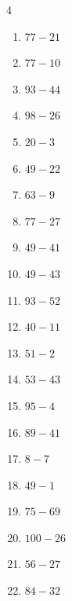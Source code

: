 \begin{multicols}{4}
\begin{enumerate}
  \item $77-21$
        \phantom{$=56$}

  \item $77-10$
        \phantom{$=67$}

  \item $93-44$
        \phantom{$=49$}

  \item $98-26$
        \phantom{$=72$}

  \item $20-3$
        \phantom{$=17$}

  \item $49-22$
        \phantom{$=27$}

  \item $63-9$
        \phantom{$=54$}

  \item $77-27$
        \phantom{$=50$}

\columnbreak %

  \item $49-41$
        \phantom{$=8$}

  \item $49-43$
        \phantom{$=6$}

  \item $93-52$
        \phantom{$=41$}

  \item $40-11$
        \phantom{$=29$}

  \item $51-2$
        \phantom{$=49$}

  \item $53-43$
        \phantom{$=10$}

  \item $95-4$
        \phantom{$=91$}

  \item $89-41$
        \phantom{$=48$}

  \item $8-7$
        \phantom{$=1$}

  \item $49-1$
        \phantom{$=48$}

  \item $75-69$
        \phantom{$=6$}

  \item $100-26$
        \phantom{$=74$}

  \item $56-27$
        \phantom{$=29$}

  \item $84-32$
        \phantom{$=52$}


\end{enumerate}
\end{multicols}
